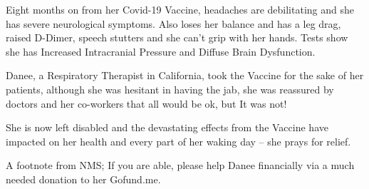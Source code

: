 Eight months on from her Covid-19 Vaccine, headaches are debilitating and she
has severe neurological symptoms. Also loses her balance and has a leg drag,
raised D-Dimer, speech stutters and she can’t grip with her hands.  Tests show
she has Increased Intracranial Pressure and Diffuse Brain Dysfunction.

Danee, a Respiratory Therapist in California, took the Vaccine for the sake of
her patients, although she was hesitant in having the jab, she was reassured by
doctors and her co-workers that all would be ok, but It was not!

She is now left disabled and the devastating effects from the Vaccine have
impacted on her health and every part of her waking day – she prays for relief.

A footnote from NMS; If you are able, please help Danee financially via a much
needed donation to her Gofund.me.


